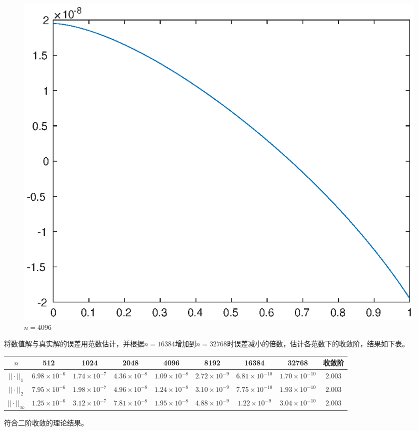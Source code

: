 \documentclass[lang=cn,10pt]{elegantbook}
\begin{document}
\begin{figure}[H]
\begin{minipage}[t]{0.24\linewidth}
    \caption*{$n=2048$}
  \end{minipage}
  \begin{minipage}[t]{0.24\linewidth}
    \centering
    \includegraphics[width=0.8\linewidth]{figure/1-2-4.eps}
    \caption*{$n=4096$}
  \end{minipage}
\end{figure}

将数值解与真实解的误差用范数估计，并根据$n=16384$增加到$n=32768$时误差减小的倍数，估计各范数下的收敛阶，结果如下表。

\begin{table}[H]
  \centering
  \small
  \begin{tabular}{c|ccccccc|c}
  \textbf{$n$}        & 512                 & 1024                 & 2048                 & 4096                 & 8192                 & 16384                & 32768                & 收敛阶 \\ \hline
  $||\cdot||_1$      & $6.98\times 10^{-6}$ & $1.74\times 10^{-7}$ & $4.36\times 10^{-8}$ & $1.09\times 10^{-8}$ & $2.72\times 10^{-9}$ & $6.81\times 10^{-10}$ & $1.70\times 10^{-10}$ & $2.003$\\
  $||\cdot||_2$      & $7.95\times 10^{-6}$ & $1.98\times 10^{-7}$ & $4.96\times 10^{-8}$ & $1.24\times 10^{-8}$ & $3.10\times 10^{-9}$ & $7.75\times 10^{-10}$ & $1.93\times 10^{-10}$ & $2.003$\\
  $||\cdot||_\infty$ & $1.25\times 10^{-6}$ & $3.12\times 10^{-7}$ & $7.81\times 10^{-8}$ & $1.95\times 10^{-8}$ & $4.88\times 10^{-9}$ & $1.22\times 10^{-9}$ & $3.04\times 10^{-10}$ & $2.003$
  \end{tabular}
\end{table}

符合二阶收敛的理论结果。
\end{document}
